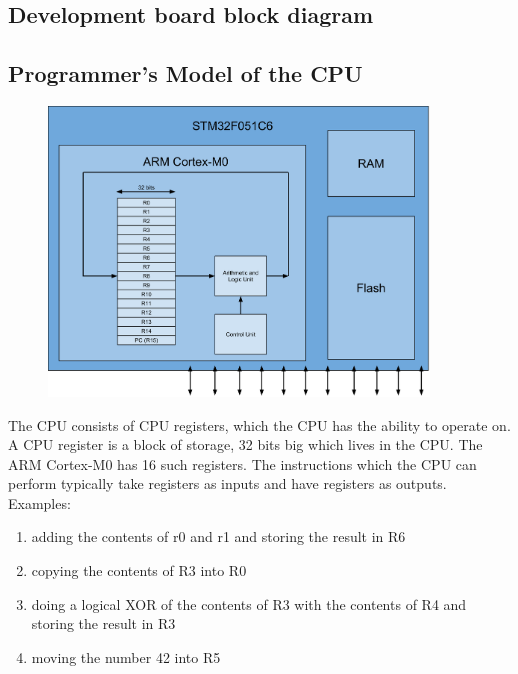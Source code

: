 \subsection{Development board block diagram}

\subsection{Programmer's Model of the CPU}
\begin{figure}
  \centering
  \includegraphics[width=0.9\textwidth]{./week1/programmers_model_v0.pdf}
\end{figure}
The CPU consists of CPU registers, which the CPU has the ability to operate on. A CPU register is a block of storage, 32 bits big which lives in the CPU. The ARM Cortex-M0 has 16 such registers. 
The instructions which the CPU can perform typically take registers as inputs and have registers as outputs. Examples:
\begin{enumerate}
  \item adding the contents of r0 and r1 and storing the result in R6
  \item copying the contents of R3 into R0
  \item doing a logical XOR of the contents of R3 with the contents of R4 and storing the result in R3
  \item moving the number 42 into R5
\end{enumerate}

